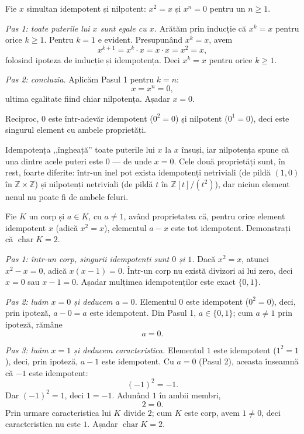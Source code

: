 \begin{solutie}
Fie $x$ simultan idempotent și nilpotent: $x^{2}=x$ și $x^{n}=0$
pentru un $n\ge 1$.

\smallskip
\textit{Pas 1: toate puterile lui $x$ sunt egale cu $x$.} Arătăm prin
inducție că $x^{k}=x$ pentru orice $k\ge 1$. Pentru $k=1$ e evident.
Presupunând $x^{k}=x$, avem
\[
  x^{k+1}=x^{k}\cdot x=x\cdot x=x^{2}=x ,
\]
folosind ipoteza de inducție și idempotența. Deci $x^{k}=x$
pentru orice $k\ge 1$.

\smallskip
\textit{Pas 2: concluzia.} Aplicăm Pasul 1 pentru $k=n$:
\[
  x=x^{n}=0 ,
\]
ultima egalitate fiind chiar nilpotența. Așadar $x=0$.

Reciproc, $0$ este într-adevăr idempotent ($0^{2}=0$) și nilpotent
($0^{1}=0$), deci este singurul element cu ambele proprietăți.
\end{solutie}

\begin{obs}
Idempotența ,,îngheață'' toate puterile lui $x$ la $x$
însuși, iar nilpotența spune că una dintre acele puteri este
$0$ --- de unde $x=0$. Cele două proprietăți sunt, în rest,
foarte diferite: într-un inel pot exista idempotenți netriviali (de
pildă $(1,0)$ în $\mathbb{Z}\times\mathbb{Z}$) și nilpotenți
netriviali (de pildă $t$ în $\mathbb{Z}[t]/(t^{2})$), dar niciun
element nenul nu poate fi de ambele feluri.
\end{obs}

\begin{problema}
Fie $K$ un corp și $a\in K$, cu $a\neq 1$, având proprietatea
că, pentru orice element idempotent $x$ (adică $x^{2}=x$), elementul
$a-x$ este tot idempotent. Demonstrați că $\operatorname{char}K=2$.
\end{problema}

\begin{solutie}
\textit{Pas 1: într-un corp, singurii idempotenți sunt $0$ și $1$.}
Dacă $x^{2}=x$, atunci $x^{2}-x=0$, adică $x(x-1)=0$. Într-un corp
nu există divizori ai lui zero, deci $x=0$ sau $x-1=0$. Așadar
mulțimea idempotenților este exact $\{0,1\}$.

\smallskip
\textit{Pas 2: luăm $x=0$ și deducem $a=0$.} Elementul $0$ este
idempotent ($0^{2}=0$), deci, prin ipoteză, $a-0=a$ este idempotent. Din
Pasul 1, $a\in\{0,1\}$; cum $a\neq 1$ prin ipoteză, rămâne
\[
  a=0 .
\]

\smallskip
\textit{Pas 3: luăm $x=1$ și deducem caracteristica.} Elementul $1$
este idempotent ($1^{2}=1$), deci, prin ipoteză, $a-1$ este idempotent.
Cu $a=0$ (Pasul 2), aceasta înseamnă că $-1$ este idempotent:
\[
  (-1)^{2}=-1 .
\]
Dar $(-1)^{2}=1$, deci $1=-1$. Adunând $1$ în ambii membri,
\[
  2=0 .
\]
Prin urmare caracteristica lui $K$ divide $2$; cum $K$ este corp, avem
$1\neq 0$, deci caracteristica nu este $1$. Așadar
$\operatorname{char}K=2$.
\end{solutie}

